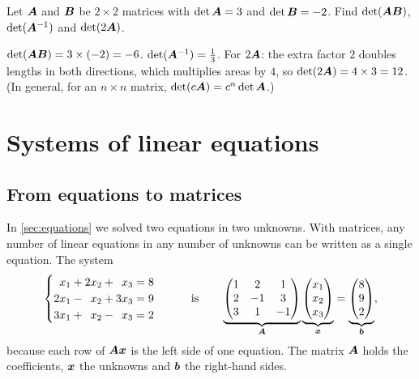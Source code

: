 \begin{exercise}
Let $\bm{A}$ and $\bm{B}$ be $2\times2$ matrices with $\det\bm{A} = 3$ and
$\det\bm{B} = -2$. Find $\det(\bm{A}\bm{B})$, $\det(\bm{A}^{-1})$ and $\det(2\bm{A})$.
\end{exercise}
\begin{solution}
$\det(\bm{A}\bm{B}) = 3 \times (-2) = -6$. $\det(\bm{A}^{-1}) = \tfrac13$. For $2\bm{A}$:
the extra factor $2$ doubles lengths in both directions, which multiplies
areas by $4$, so $\det(2\bm{A}) = 4\times3 = 12$. (In general, for an $n\times n$
matrix, $\det(c\bm{A}) = c^n\det\bm{A}$.)
\end{solution}

\section{Systems of linear equations}\label{sec:linear-systems}

\subsection{From equations to matrices}

In \cref{sec:equations} we solved two equations in two unknowns. With matrices,
any number of linear equations in any number of unknowns can be written as a
single equation. The system
\[
  \begin{cases}
    \phantom{2}x_1 + 2x_2 + \phantom{3}x_3 = 8\\
    2x_1 - \phantom{2}x_2 + 3x_3 = 9\\
    3x_1 + \phantom{2}x_2 - \phantom{3}x_3 = 2
  \end{cases}
  \qquad\text{is}\qquad
  \underbrace{\begin{pmatrix} 1 & 2 & 1\\ 2 & -1 & 3\\ 3 & 1 & -1\end{pmatrix}}_{\bm{A}}
  \underbrace{\begin{pmatrix} x_1\\ x_2\\ x_3\end{pmatrix}}_{\bm{x}}
  = \underbrace{\begin{pmatrix} 8\\ 9\\ 2\end{pmatrix}}_{\bm{b}},
\]
because each row of $\bm{A}\bm{x}$ is the left side of one equation. The matrix
$\bm{A}$ holds the coefficients, $\bm{x}$ the unknowns and $\bm{b}$ the right-hand
sides.

